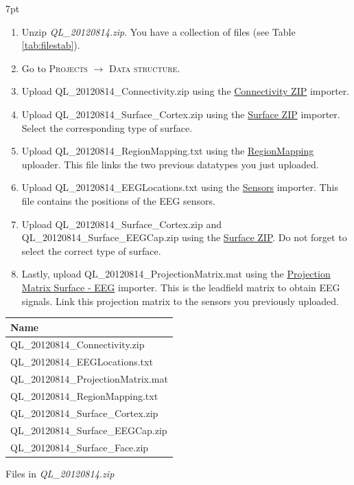 \documentclass{tufte-handout}
\newenvironment{formal}{%
  \def\FrameCommand{%
    \hspace{1pt}%
    {\color{DarkBlue}\vrule width 2pt}%
    {\color{formalshade}\vrule width 4pt}%
    \colorbox{formalshade}%
  }%
  \MakeFramed{\advance\hsize-\width\FrameRestore}%
  \noindent\hspace{-4.55pt}%
  \begin{adjustwidth}{}{7pt}%
  \vspace{2pt}\vspace{2pt}%
}
{%
  \vspace{2pt}\end{adjustwidth}\endMakeFramed%
}
\begin{document}
\begin{formal}
\begin{enumerate}
\item Unzip \textit{QL\_20120814.zip}. You have a collection of files (see Table \ref{tab:filestab}).
\item Go to \textsc{Projects} $\rightarrow$ \textsc{Data structure}.
\item Upload   QL\_20120814\_Connectivity.zip using the \underline{Connectivity ZIP} importer.
\item Upload QL\_20120814\_Surface\_Cortex.zip using the \underline{Surface ZIP} importer. Select the corresponding type of surface. 
\item Upload QL\_20120814\_RegionMapping.txt using the \underline{RegionMapping} uploader. This file links the two previous datatypes you just uploaded. 
\item Upload QL\_20120814\_EEGLocations.txt using the \underline{Sensors} importer. This file contains the positions of the EEG sensors. 
\item Upload QL\_20120814\_Surface\_Cortex.zip and QL\_20120814\_Surface\_EEGCap.zip using the \underline{Surface ZIP}. Do not forget to select the correct type of surface. 
\item Lastly, upload QL\_20120814\_ProjectionMatrix.mat using the \underline{Projection Matrix Surface  - EEG} importer. This is the leadfield matrix to obtain EEG signals. Link this projection matrix to the sensors you previously uploaded. 

\end{enumerate}
\end{formal}

\begin{margintable}
  \centering
  \selectfont
  \begin{tabular}{l}
    \toprule
    Name \\
    \midrule
    QL\_20120814\_Connectivity.zip\\
QL\_20120814\_EEGLocations.txt\\
QL\_20120814\_ProjectionMatrix.mat\\
QL\_20120814\_RegionMapping.txt\\
QL\_20120814\_Surface\_Cortex.zip\\
QL\_20120814\_Surface\_EEGCap.zip\\
QL\_20120814\_Surface\_Face.zip\\
    \bottomrule
  \end{tabular}
  \caption{Files in \textit{QL\_20120814.zip} }
  \label{tab:filestab}
\end{margintable}
\end{document}
